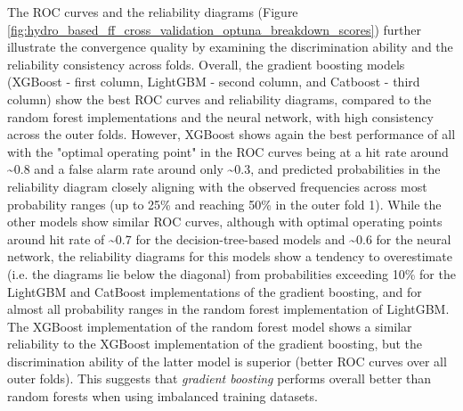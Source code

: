 The ROC curves and the reliability diagrams (Figure \ref{fig:hydro_based_ff_cross_validation_optuna_breakdown_scores}) further illustrate the convergence quality by examining the discrimination ability and the reliability consistency across folds. Overall, the gradient boosting models (XGBoost - first column, LightGBM - second column, and Catboost - third column) show the best ROC curves and reliability diagrams, compared to the random forest implementations and the neural network, with high consistency across the outer folds. However, XGBoost shows again the best performance of all with the "optimal operating point" in the ROC curves being at a hit rate around \sim0.8 and a false alarm rate around only \sim0.3, and predicted probabilities in the reliability diagram closely aligning with the observed frequencies across most probability ranges (up to 25\% and reaching 50\% in the outer fold 1). While the other models show similar ROC curves, although with optimal operating points around hit rate of \sim0.7 for the decision-tree-based models and \sim0.6 for the neural network, the reliability diagrams for this models show a tendency to overestimate (i.e. the diagrams lie below the diagonal) from probabilities exceeding 10\% for the LightGBM and CatBoost implementations of the gradient boosting, and for almost all probability ranges in the random forest implementation of LightGBM. The XGBoost implementation of the random forest model shows a similar reliability to the XGBoost implementation of the gradient boosting, but the discrimination ability of the latter model is superior (better ROC curves over all outer folds). This suggests that \textit{gradient boosting} performs overall better than random forests when using imbalanced training datasets.

